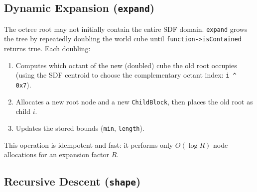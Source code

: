 \documentclass[10pt,a4paper]{article}
\begin{document}
\begin{center}
\end{center}

\subsection{Dynamic Expansion (\texttt{expand})}

The octree root may not initially contain the entire SDF domain.
\lstinline{expand} grows the tree by repeatedly doubling the world cube
until \lstinline{function->isContained} returns true.  Each doubling:
\begin{enumerate}
  \item Computes which octant of the new (doubled) cube the old root
    occupies (using the SDF centroid to choose the complementary octant
    index: \lstinline{i ^ 0x7}).
  \item Allocates a new root node and a new \lstinline{ChildBlock}, then
    places the old root as child $i$.
  \item Updates the stored bounds (\lstinline{min}, \lstinline{length}).
\end{enumerate}
This operation is idempotent and fast: it performs only $O(\log R)$ node
allocations for an expansion factor $R$.

\subsection{Recursive Descent (\texttt{shape})}
\label{sec:shape:shape}
\end{document}

